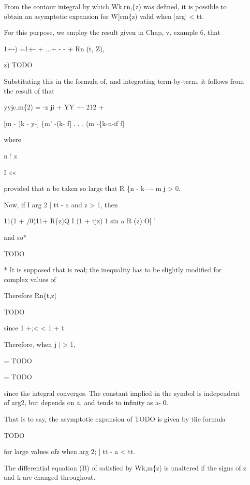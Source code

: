 From the contour integral by which Wk,rn,\{z) was defined, it is
possible to obtain an asymptotic expansion for W]cm\{z) valid when
|arg| < tt.

For this purpose, we employ the result given in Chap, v, example 6,
that

1+-) =1+- + ...+ - - + Rn (t, Z),

z) TODO

Substituting this in the formula of, and integrating
term-by-term, it follows from the result of that

yyjc,m\{2) =  -z ji + YY +- 212 + 

[m - (k - y-] \{m' -(k- f] . . . (m -\{k-n-if f]

where

n ! z

I ««

provided that n be taken so large that R \{n - k---- m j > 0.

Now, if I arg 2 |  tt - a and z > 1, then

11(1 + /0)11+ R\{z)Q I (1 + tjz) 1  sin a R (z)  O] '

and so*

TODO

* It is supposed that is real; the inequality has to be slightly
modified for complex values of

%
%

Therefore Rn\{t,z)

TODO

since 1 +;< < 1 + t

Therefore, when j  | > 1,

= TODO

= TODO

since the integral converges. The constant implied in the symbol is
independent of arg2, but depends on a, and tends to infinity as a-
0.

That is to say, the asymptotic expansion of TODO is given by tlie
formula

TODO

for large values ofz when arg 2; |  tt - a < tt.


The differential equation (B) of satisfied by Wk,m\{z) is
unaltered if the signs of z and k are changed throughout.

